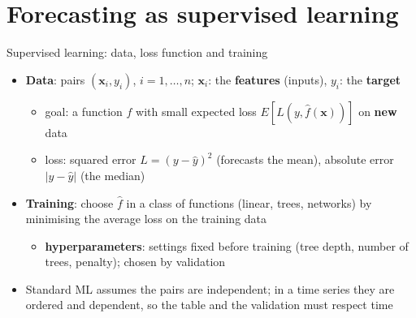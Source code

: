 \section{Forecasting as supervised learning}

\begin{frame}{Supervised learning: data, loss function and training}
\itemsize{\small}
\begin{itemize}
    \item \textbf{Data}: pairs $(\mathbf{x}_i, y_i)$, $i = 1, \dots, n$; $\mathbf{x}_i$: the \textbf{features} (inputs), $y_i$: the \textbf{target}
    \begin{itemize}
        \item goal: a function $\hat f$ with small expected loss $E[L(y, \hat f(\mathbf{x}))]$ on \textbf{new} data
        \item loss: squared error $L = (y - \hat y)^2$ (forecasts the mean), absolute error $|y - \hat y|$ (the median)
    \end{itemize}
    \item \textbf{Training}: choose $\hat f$ in a class of functions (linear, trees, networks) by minimising the average loss on the training data
    \begin{itemize}
        \item \textbf{hyperparameters}: settings fixed before training (tree depth, number of trees, penalty); chosen by validation
    \end{itemize}
    \item Standard ML assumes the pairs are independent; in a time series they are ordered and dependent, so the table and the validation must respect time
\end{itemize}
\end{frame}

